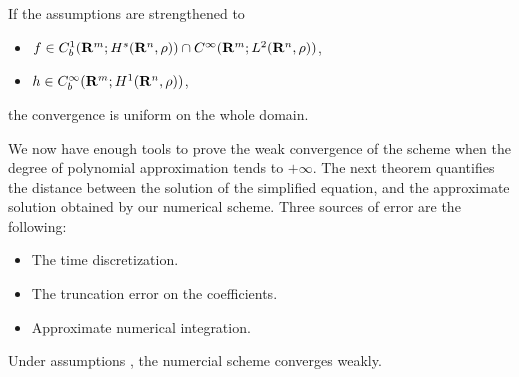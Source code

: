 \begin{remark}
   If the assumptions are strengthened to  
   \begin{itemize}
       \item $f \in C_b^{1}(\mathbf R^m;H^{s}(\mathbf R^n, \rho)) \cap C^{\infty}(\mathbf R^m; L^{2}(\mathbf R^n,\rho))$,
       \item $h \in C_b^{\infty}(\mathbf R^m; H^{1}(\mathbf R^n, \rho))$,
   \end{itemize}
   the convergence is uniform on the whole domain.
\end{remark}
We now have enough tools to prove the weak convergence of the scheme when the
degree of polynomial approximation tends to $+\infty$. The next theorem
quantifies the distance between the solution of the simplified equation, and
the approximate solution obtained by our numerical scheme. Three sources of error are the following:
\begin{itemize}
    \item The time discretization. 
    \item The truncation error on the coefficients.
    \item Approximate numerical integration.
\end{itemize}
\begin{theorem}
    Under assumptions , the numercial scheme converges weakly.
\end{theorem}

